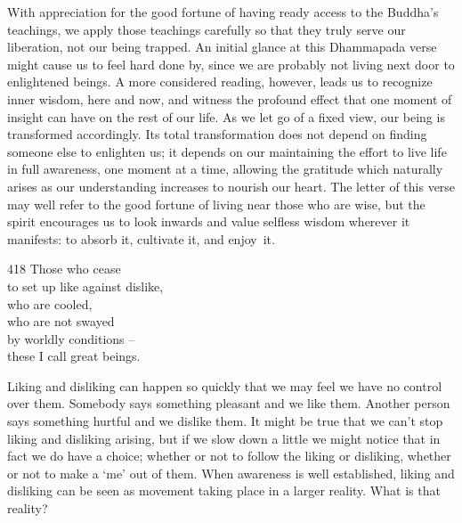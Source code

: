 \begin{dhpRefl}
  With appreciation for the good fortune of having ready access to the Buddha's
  teachings, we apply those teachings carefully so that they truly serve our
  liberation, not our being trapped. An initial glance at this Dhammapada verse
  might cause us to feel hard done by, since we are probably not living next
  door to enlightened beings. A more considered reading, however, leads us to
  recognize inner wisdom, here and now, and witness the profound effect that one
  moment of insight can have on the rest of our life. As we let go of a fixed
  view, our being is transformed accordingly. Its total transformation does not
  depend on finding someone else to enlighten us; it depends on our maintaining
  the effort to live life in full awareness, one moment at a time, allowing the
  gratitude which naturally arises as our understanding increases to nourish our
  heart. The letter of this verse may well refer to the good fortune of living
  near those who are wise, but the spirit encourages us to look inwards and
  value selfless wisdom wherever it manifests: to absorb it, cultivate it, and
  enjoy~it.
\end{dhpRefl}


\begin{dhpVerse}{418}
\label{dhp-418}
Those who cease\\
to set up like against dislike,\\
who are cooled,\\
who are not swayed\\
by worldly conditions --\\
these I call great beings.
\end{dhpVerse}

\begin{dhpRefl}
  Liking and disliking can happen so quickly that we may feel we have no control
  over them. Somebody says something pleasant and we like them. Another person
  says something hurtful and we dislike them. It might be true that we can't
  stop liking and disliking arising, but if we slow down a little we might
  notice that in fact we do have a choice; whether or not to follow the liking
  or disliking, whether or not to make a ‘me’ out of them. When awareness is
  well established, liking and disliking can be seen as movement taking place in
  a larger reality. What is that reality?
\end{dhpRefl}


